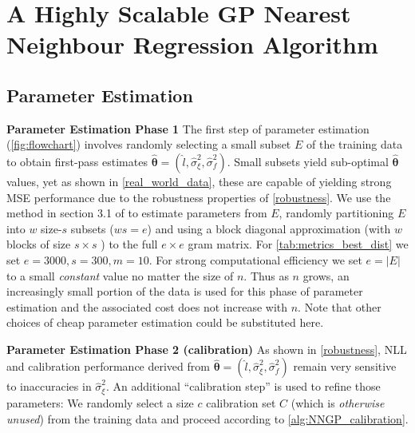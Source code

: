 \section{A Highly Scalable GP Nearest Neighbour Regression Algorithm}
\label{simple_implementation}
\subsection{Parameter Estimation}
\label{parameter_estimation}
\textbf{Parameter Estimation Phase 1} The first step of parameter estimation (\autoref{fig:flowchart}) involves randomly selecting a small subset $E$ of the training data to obtain first-pass estimates $\hat{\bm{\theta}} = (\hat{l},{\hat{\sigma}}_\xi^2,{\hat{\sigma}}_f^2)$. Small subsets yield sub-optimal $\hat{\bm{\theta}}$ values, yet as shown in \ref{real_world_data}, these are capable of yielding strong MSE performance due to the robustness properties of \autoref{robustness}. We use the method in section 3.1 of \cite{deisenroth2015distributed} to estimate parameters from $E$, randomly partitioning $E$ into $w$ size-$s$ subsets ($ws = e$) and using a block diagonal approximation (with $w$ blocks of size $s \times s$ ) to the full $e \times e$ gram matrix. For \autoref{tab:metrics_best_dist} we set $e = 3000,s = 300,m = 10$.  For strong computational efficiency we set $e=|E|$ to a small {\it constant} value no matter the size of $n$. Thus as $n$ grows, an increasingly small portion of the data is used for this phase of parameter estimation and the associated cost does not increase with $n$. Note that other choices of cheap parameter estimation could be substituted here.

\textbf{Parameter Estimation Phase 2 (calibration)} As shown in \autoref{robustness}, NLL and calibration performance derived from $\hat{\bm{\theta}} = (\hat{l},{\hat{\sigma}}_\xi^2,{\hat{\sigma}}_f^2)$ remain very sensitive to inaccuracies in $\hat{\sigma}_\xi^2$. An additional ``calibration step'' is used to refine those parameters: We randomly select a size $c$ calibration set $C$ (which is {\it otherwise unused}) from the training data and proceed according to \autoref{alg:NNGP_calibration}.


